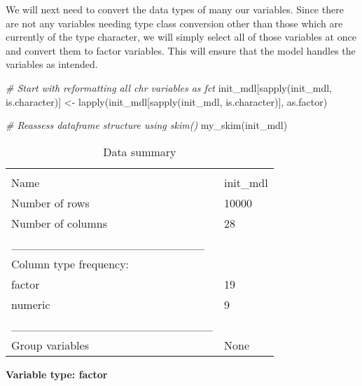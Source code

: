 \documentclass[
]{article}
\newenvironment{Shaded}{\begin{snugshade}}{\end{snugshade}}
\newcommand{\CommentTok}[1]{\textcolor[rgb]{0.56,0.35,0.01}{\textit{#1}}}
\newcommand{\FunctionTok}[1]{\textcolor[rgb]{0.00,0.00,0.00}{#1}}
\newcommand{\NormalTok}[1]{#1}
\newcommand{\OtherTok}[1]{\textcolor[rgb]{0.56,0.35,0.01}{#1}}
\begin{document}
We will next need to convert the data types of many our variables. Since
there are not any variables needing type class conversion other than
those which are currently of the type character, we will simply select
all of those variables at once and convert them to factor variables.
This will ensure that the model handles the variables as intended.

\begin{Shaded}
\begin{Highlighting}[]
\CommentTok{\# Start with reformatting all chr variables as fct}
\NormalTok{init\_mdl[}\FunctionTok{sapply}\NormalTok{(init\_mdl, }
\NormalTok{                is.character)] }\OtherTok{\textless{}{-}} \FunctionTok{lapply}\NormalTok{(init\_mdl[}\FunctionTok{sapply}\NormalTok{(init\_mdl, }
\NormalTok{                                                         is.character)], }
\NormalTok{                                         as.factor)}

\CommentTok{\# Reassess dataframe structure using skim()}
\FunctionTok{my\_skim}\NormalTok{(init\_mdl)}
\end{Highlighting}
\end{Shaded}

\begin{longtable}[]{@{}ll@{}}
\caption{Data summary}\tabularnewline
\toprule
& \\
\midrule
\endfirsthead
\toprule
& \\
\midrule
\endhead
Name & init\_mdl \\
Number of rows & 10000 \\
Number of columns & 28 \\
\_\_\_\_\_\_\_\_\_\_\_\_\_\_\_\_\_\_\_\_\_\_\_ & \\
Column type frequency: & \\
factor & 19 \\
numeric & 9 \\
\_\_\_\_\_\_\_\_\_\_\_\_\_\_\_\_\_\_\_\_\_\_\_\_ & \\
Group variables & None \\
\bottomrule
\end{longtable}

\textbf{Variable type: factor}
\end{document}
